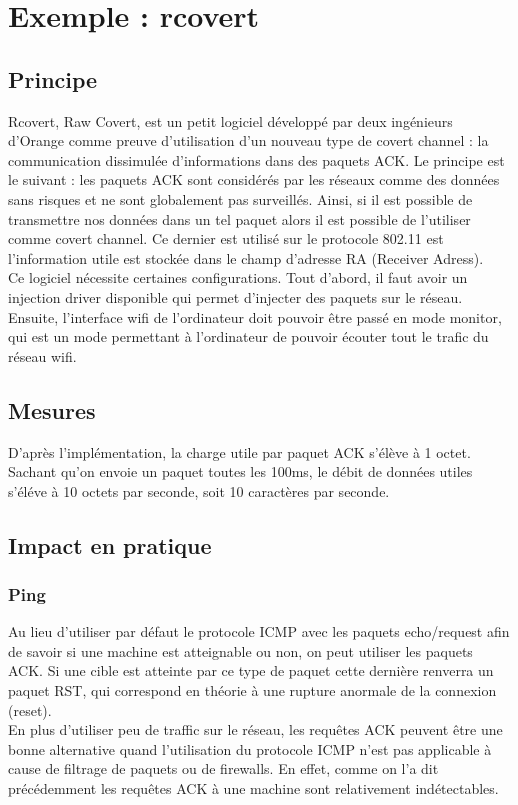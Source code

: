 \documentclass{acm_proc_article-sp}
\begin{document}
\begin{figure}
\centering
{}
\end{figure}


\section{Exemple : rcovert}
\subsection{Principe}
Rcovert, Raw Covert, est un petit logiciel développé par deux ingénieurs d'Orange comme preuve d'utilisation d'un nouveau type de covert channel : la communication dissimulée d'informations dans des paquets ACK. Le principe est le suivant : les paquets ACK sont considérés par les réseaux comme des données sans risques et ne sont globalement pas surveillés. Ainsi, si il est possible de transmettre nos données dans un tel paquet alors il est possible de l'utiliser comme covert channel. Ce dernier est utilisé sur le protocole 802.11 est l'information utile est stockée dans le champ d'adresse RA (Receiver Adress).\\
Ce logiciel nécessite certaines configurations. Tout d'abord, il faut avoir un injection driver disponible qui permet d'injecter des paquets sur le réseau. Ensuite, l'interface wifi de l'ordinateur doit pouvoir être passé en mode monitor, qui est un mode permettant à l'ordinateur de pouvoir écouter tout le trafic du réseau wifi.

\subsection{Mesures}
D'après l'implémentation, la charge utile par paquet ACK s'élève à 1 octet. Sachant qu'on envoie un paquet toutes les 100ms, le débit de données utiles s'éléve à 10 octets par seconde, soit 10 caractères par seconde.

\subsection{Impact en pratique}
\subsubsection{Ping}
Au lieu d'utiliser par défaut le protocole ICMP avec les paquets echo/request afin de savoir si une machine est atteignable ou non, on peut utiliser les paquets ACK. Si une cible est atteinte par ce type de paquet cette dernière renverra un paquet RST, qui correspond en théorie à une rupture anormale de la connexion (reset).\\
En plus d'utiliser peu de traffic sur le réseau, les requêtes ACK peuvent être une bonne alternative quand l'utilisation du protocole ICMP n'est pas applicable à cause de filtrage de paquets ou de firewalls. En effet, comme on l'a dit précédemment les requêtes ACK à une machine sont relativement indétectables. 
\end{document}
